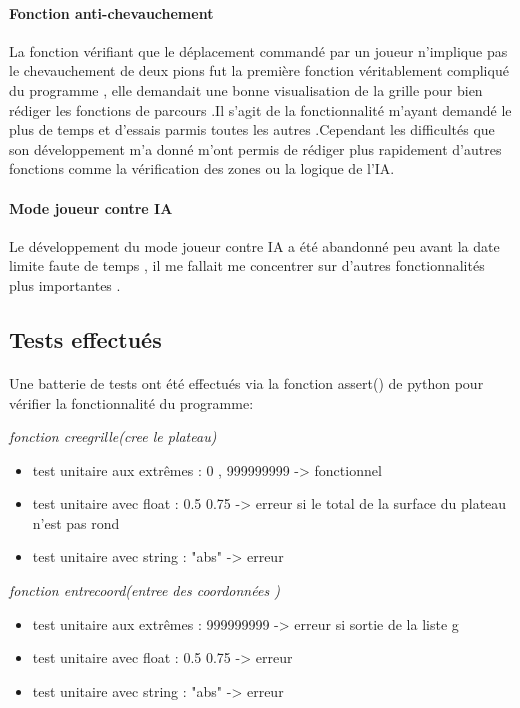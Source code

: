 \documentclass[a4paper,12pt]{article}
\begin{document}
\paragraph{Fonction anti-chevauchement}
La fonction vérifiant que le déplacement commandé par un joueur n'implique pas le chevauchement de deux pions fut la première fonction véritablement compliqué du programme , elle demandait une bonne visualisation de la grille pour bien rédiger les fonctions de parcours .Il s'agit de la fonctionnalité m'ayant demandé le plus de temps et d'essais parmis toutes les autres .Cependant les difficultés que son développement m'a donné m'ont permis de rédiger plus rapidement d'autres fonctions comme la vérification des zones ou la logique de l'IA.
\newline
\newline
\paragraph{Mode joueur contre IA}
Le développement du mode joueur contre IA a été abandonné peu avant la date limite faute de temps , il me fallait me concentrer sur d'autres fonctionnalités plus importantes .

\newpage
\begin{center}
\section{Tests effectués}
\end{center}

\paragraph{}
Une batterie de tests ont été effectués via la fonction assert() de python pour vérifier la fonctionnalité du programme:
\newline

\emph{fonction creegrille(cree le plateau)}
\begin{itemize}
\item test unitaire aux extrêmes : 0 , 999999999 -> fonctionnel
\item test unitaire avec float   : 0.5 0.75  -> erreur si le total de la surface du plateau n'est pas rond
\item test unitaire avec string  : "abs"  -> erreur
\newline
\end{itemize}

\emph{fonction entrecoord(entree des coordonnées )}
\begin{itemize}
\item test unitaire aux extrêmes :  999999999 -> erreur si sortie de la liste g
\item test unitaire avec float   : 0.5 0.75  -> erreur 
\item test unitaire avec string  : "abs"  -> erreur
\end{itemize}
\end{document}
